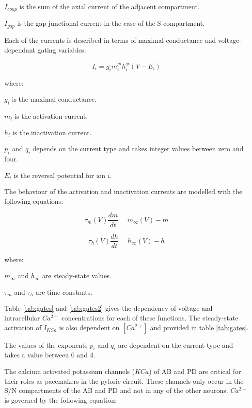 $I_{coup}$ is the sum of the axial current of the adjacent compartment. 

$I_{gap}$ is the gap junctional current in the case of the S compartment.

Each of the currents is described in terms of maximal conductance and voltage-dependant gating variables:

\begin{equation}
I_{i} = g_{i}m_{i}^{pi}h_{i}^{qi}(V-E_{i})
\end{equation}

where:

$g_{i}$ is the maximal conductance.

$m_{i}$ is the activation current.

$h_{i}$ is the inactivation current.

$p_{i}$ and $q_{i}$ depends on the current type and takes integer values between zero and four.

$E_{i}$ is the reversal potential for ion ${i}$.

The behaviour of the activation and inactivation currents are modelled with the following equations:

\begin{equation}
	\label{eq:activation}
	\tau_{m}(V)\frac{dm}{dt} = m_{\infty}(V)-m
\end{equation}

\begin{equation}
	\label{eq:inactivation}
	\tau_{h}(V)\frac{dh}{dt}=h_{\infty}(V)-h
\end{equation}

where:

$m_{\infty}$ and $h_{\infty}$ are steady-state values.

$\tau_{m}$ and $\tau_{h}$ are time constants.

Table \ref{tab:gates} and \ref{tab:gates2} gives the dependency of voltage and intracellular $Ca^{2+}$ concentrations for each of these functions. The steady-state activation of $I_{KCa}$ is also dependent on $[Ca^{2+}]$ and provided in table \ref{tab:gates}.

The values of the exponents $p_{i}$ and $q_{i}$ are dependent on the current type and takes a value between 0 and 4.

The calcium activated potassium channels ($KCa$) of \ac{AB} and \ac{PD} are critical for their roles as pacemakers in the pyloric circuit. These channels only occur in the S/N compartments of the \ac{AB} and \ac{PD} and not in any of the other neurons. $Ca^{2+}$ is governed by the following equation:

